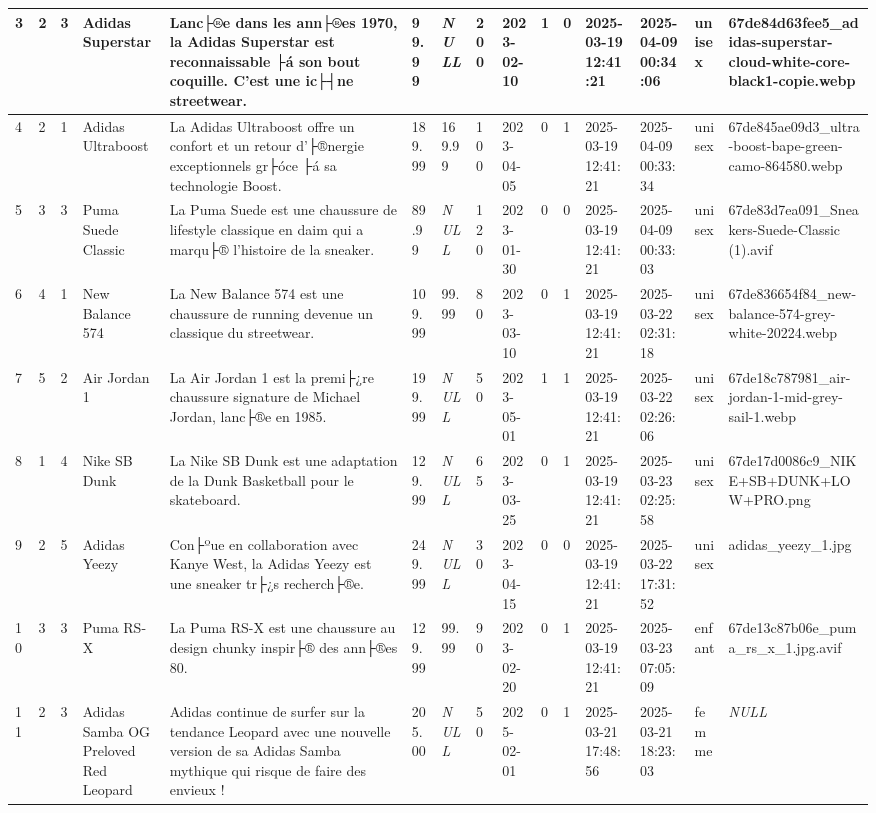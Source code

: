 \begin{longtable}{|l|l|l|l|l|l|l|l|l|l|l|l|l|l|l|}
3 & 2 & 3 & Adidas Superstar & Lanc├®e dans les ann├®es 1970, la Adidas Superstar est reconnaissable ├á son bout coquille. C'est une ic├┤ne streetwear. & 99.99 & \textit{NULL} & 200 & 2023-02-10 & 1 & 0 & 2025-03-19 12:41:21 & 2025-04-09 00:34:06 & unisex & 67de84d63fee5\_adidas-superstar-cloud-white-core-black1-copie.webp \\ \hline 
4 & 2 & 1 & Adidas Ultraboost & La Adidas Ultraboost offre un confort et un retour d'├®nergie exceptionnels gr├óce ├á sa technologie Boost. & 189.99 & 169.99 & 100 & 2023-04-05 & 0 & 1 & 2025-03-19 12:41:21 & 2025-04-09 00:33:34 & unisex & 67de845ae09d3\_ultra-boost-bape-green-camo-864580.webp \\ \hline 
5 & 3 & 3 & Puma Suede Classic & La Puma Suede est une chaussure de lifestyle classique en daim qui a marqu├® l'histoire de la sneaker. & 89.99 & \textit{NULL} & 120 & 2023-01-30 & 0 & 0 & 2025-03-19 12:41:21 & 2025-04-09 00:33:03 & unisex & 67de83d7ea091\_Sneakers-Suede-Classic (1).avif \\ \hline 
6 & 4 & 1 & New Balance 574 & La New Balance 574 est une chaussure de running devenue un classique du streetwear. & 109.99 & 99.99 & 80 & 2023-03-10 & 0 & 1 & 2025-03-19 12:41:21 & 2025-03-22 02:31:18 & unisex & 67de836654f84\_new-balance-574-grey-white-20224.webp \\ \hline 
7 & 5 & 2 & Air Jordan 1 & La Air Jordan 1 est la premi├¿re chaussure signature de Michael Jordan, lanc├®e en 1985. & 199.99 & \textit{NULL} & 50 & 2023-05-01 & 1 & 1 & 2025-03-19 12:41:21 & 2025-03-22 02:26:06 & unisex & 67de18c787981\_air-jordan-1-mid-grey-sail-1.webp \\ \hline 
8 & 1 & 4 & Nike SB Dunk & La Nike SB Dunk est une adaptation de la Dunk Basketball pour le skateboard. & 129.99 & \textit{NULL} & 65 & 2023-03-25 & 0 & 1 & 2025-03-19 12:41:21 & 2025-03-23 02:25:58 & unisex & 67de17d0086c9\_NIKE+SB+DUNK+LOW+PRO.png \\ \hline 
9 & 2 & 5 & Adidas Yeezy & Con├ºue en collaboration avec Kanye West, la Adidas Yeezy est une sneaker tr├¿s recherch├®e. & 249.99 & \textit{NULL} & 30 & 2023-04-15 & 0 & 0 & 2025-03-19 12:41:21 & 2025-03-22 17:31:52 & unisex & adidas\_yeezy\_1.jpg \\ \hline 
10 & 3 & 3 & Puma RS-X & La Puma RS-X est une chaussure au design chunky inspir├® des ann├®es 80. & 129.99 & 99.99 & 90 & 2023-02-20 & 0 & 1 & 2025-03-19 12:41:21 & 2025-03-23 07:05:09 & enfant & 67de13c87b06e\_puma\_rs\_x\_1.jpg.avif \\ \hline 
11 & 2 & 3 & Adidas Samba OG Preloved Red Leopard & Adidas continue de surfer sur la tendance Leopard avec une nouvelle version de sa Adidas Samba mythique qui risque de faire des envieux ! & 205.00 & \textit{NULL} & 50 & 2025-02-01 & 0 & 1 & 2025-03-21 17:48:56 & 2025-03-21 18:23:03 & femme & \textit{NULL} \\ \hline 

\end{longtable}
